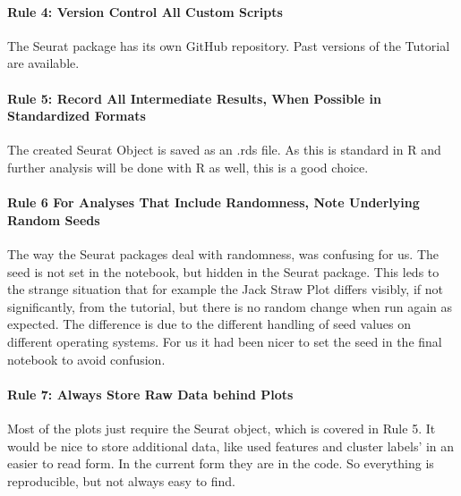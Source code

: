 \hypertarget{rule-4-version-control-all-custom-scripts}{%
\paragraph{Rule 4: Version Control All Custom
Scripts}\label{rule-4-version-control-all-custom-scripts}}

The Seurat package has its own GitHub repository. Past versions of the
Tutorial are available.

\hypertarget{rule-5-record-all-intermediate-results-when-possible-in-standardized-formats}{%
\paragraph{Rule 5: Record All Intermediate Results, When Possible in
Standardized
Formats}\label{rule-5-record-all-intermediate-results-when-possible-in-standardized-formats}}

The created Seurat Object is saved as an .rds file. As this is standard
in R and further analysis will be done with R as well, this is a good
choice.

\hypertarget{rule-6-for-analyses-that-include-randomness-note-underlying-random-seeds}{%
\paragraph{Rule 6 For Analyses That Include Randomness, Note Underlying
Random
Seeds}\label{rule-6-for-analyses-that-include-randomness-note-underlying-random-seeds}}

The way the Seurat packages deal with randomness, was confusing for us.
The seed is not set in the notebook, but hidden in the Seurat package.
This leds to the strange situation that for example the Jack Straw Plot
differs visibly, if not significantly, from the tutorial, but there is
no random change when run again as expected. The difference is due to
the different handling of seed values on different operating systems.
For us it had been nicer to set the seed in the final notebook to avoid
confusion.

\hypertarget{rule-7-always-store-raw-data-behind-plots}{%
\paragraph{Rule 7: Always Store Raw Data behind
Plots}\label{rule-7-always-store-raw-data-behind-plots}}

Most of the plots just require the Seurat object, which is covered in
Rule 5. It would be nice to store additional data, like used features
and cluster labels' in an easier to read form. In the current form they
are in the code. So everything is reproducible, but not always easy to
find.

